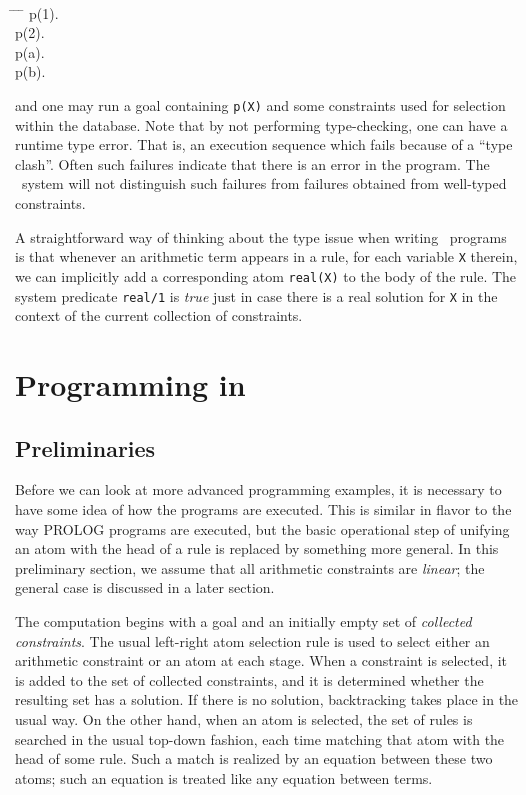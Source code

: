 \begin{minipage}{4in}
{\tt \samepage
\begin{tabbing}
\hspace{10mm} \= \hspace{10mm} \= \hspace{10mm} \= \kill
\> p(1). \\
\> p(2). \\
\> p(a). \\
\> p(b).
\end{tabbing}
}
\end{minipage}

\noindent
and one may run a goal containing {\tt p(X)} and some
constraints used for selection within the database.
Note that by not performing type-checking, one can have a
runtime type error. That is, an execution sequence which 
fails because of a ``type clash''.
Often such failures indicate that there is an error in the program.
The \CLPR\ system will not distinguish such failures from failures obtained
from well-typed constraints.

A straightforward way of thinking about the type issue when
writing \CLPR\ programs is that whenever an arithmetic term
appears in a rule, for each variable {\tt X} therein,
we can implicitly add a corresponding atom {\tt real(X)} 
to the body of the rule.
The system predicate {\tt real/1} is {\em true} just in case
there is a real solution for {\tt X} in the context of the current
collection of constraints.

\chapter{Programming in \CLPR}

\section{Preliminaries}

Before we can look at more advanced programming examples, it is necessary to
have some idea of how the programs are executed. This is similar in flavor
to the way PROLOG programs are executed, but the basic operational 
step of unifying an atom with the head of a rule is
replaced by something more general.
In this preliminary section, we assume that all arithmetic constraints
are {\em linear}; the general case is discussed in a later section.

The computation begins with a goal and an initially empty set of
{\em collected constraints}.
The usual left-right atom selection rule is used to select either an
arithmetic constraint or an atom at each stage. 
When a constraint is selected, 
it is added to the set of collected constraints,
and it is determined whether the resulting set has a solution.
If there is no solution, backtracking takes place in the usual way.
On the other hand, when an atom is selected, the set of 
rules is searched in the usual top-down fashion, each time 
matching that atom with the head of some rule.
Such a match is realized by an equation between these two atoms;
such an equation is treated like any equation between terms.

